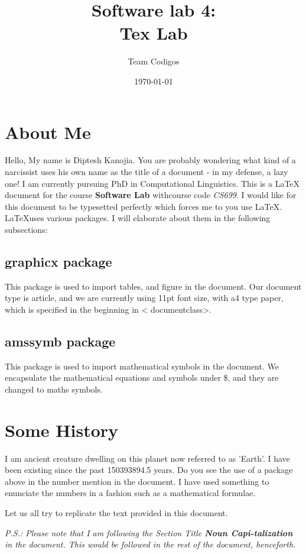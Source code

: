 \documentclass[11pt,a4paper]{article}
\begin{document}
\title{\textbf{Software lab 4:
\\{\Large Tex Lab}}}
\author{Team Codigos}
\date{\today}
\maketitle
\thispagestyle{empty}
\newpage

\tableofcontents
\newpage


\section{About Me}
Hello, My name is Diptesh Kanojia. You are probably wondering what kind of a
narcissist uses his own name as the title of a document - in my defense, a
lazy one! I am currently pursuing PhD in Computational Linguistics. This is a
\LaTeX{} document for the course \textbf{Software Lab} withcourse code
\textit{CS699}. I would like for this document to be typesetted perfectly
which forces me to you use \LaTeX{}. \LaTeX{}uses various packages. I will
elaborate about them in the following subsections:
\subsection{graphicx package}
This package is used to import tables, and figure in the document. Our
document type is article, and we are currently using 11pt font size, with a4
type paper, which is specified in the beginning in \textless
documentclass\textgreater.
\subsection{amssymb package}
This package is used to import mathematical symbols in the document. We
encapsulate the mathematical equations and symbols under \$, and they are
changed to maths symbols.

\section{Some History}
I am ancient creature dwelling on this planet now referred to as ’Earth’. I
have been existing since the past 150393894.5 years. Do you see the use of a
package above in the number mention in the document. I have used something to
enunciate the numbers in a fashion such as a mathematical formulae.

Let us all try to replicate the text provided in this document.

\textit{P.S.: Please note that I am following the Section Title \textbf{Noun
Capi-talization} in the document. This would be followed in the rest of the
document, henceforth.}
\end{document}
